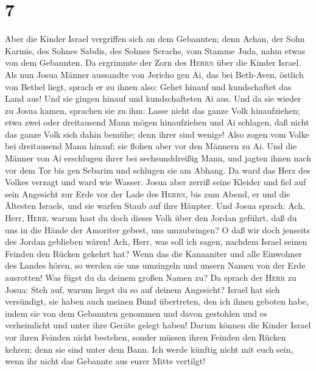 \hypertarget{section-6}{%
\section{7}\label{section-6}}

 Aber die Kinder Israel vergriffen sich an dem Gebannten;
denn Achan, der Sohn Karmis, des Sohnes Sabdis, des Sohnes Serachs, vom
Stamme Juda, nahm etwas von dem Gebannten. Da ergrimmte der Zorn des
\textsc{Herrn} über die Kinder Israel.  Als nun Josua
Männer aussandte von Jericho gen Ai, das bei Beth-Aven, östlich von
Bethel liegt, sprach er zu ihnen also: Gehet hinauf und kundschaftet das
Land aus! Und sie gingen hinauf und kundschafteten Ai aus.
 Und da sie wieder zu Josua kamen, sprachen sie zu ihm:
Lasse nicht das ganze Volk hinaufziehen; etwa zwei oder dreitausend Mann
mögen hinaufziehen und Ai schlagen, daß nicht das ganze Volk sich dahin
bemühe; denn ihrer sind wenige!  Also zogen vom Volke bei
dreitausend Mann hinauf; sie flohen aber vor den Männern zu Ai.
 Und die Männer von Ai erschlugen ihrer bei
sechsunddreißig Mann, und jagten ihnen nach vor dem Tor bis gen Sebarim
und schlugen sie am Abhang. Da ward das Herz des Volkes verzagt und ward
wie Wasser.  Josua aber zerriß seine Kleider und fiel auf
sein Angesicht zur Erde vor der Lade des \textsc{Herrn}, bis zum Abend,
er und die Ältesten Israels, und sie warfen Staub auf ihre Häupter.
 Und Josua sprach: Ach, Herr, \textsc{Herr}, warum hast du
doch dieses Volk über den Jordan geführt, daß du uns in die Hände der
Amoriter gebest, uns umzubringen? O daß wir doch jenseits des Jordan
geblieben wären!  Ach, Herr, was soll ich sagen, nachdem
Israel seinen Feinden den Rücken gekehrt hat?  Wenn das
die Kanaaniter und alle Einwohner des Landes hören, so werden sie uns
umzingeln und unsern Namen von der Erde ausrotten! Was fügst du da
deinem großen Namen zu?  Da sprach der \textsc{Herr} zu
Josua: Steh auf, warum liegst du so auf deinem Angesicht?
 Israel hat sich versündigt, sie haben auch meinen Bund
übertreten, den ich ihnen geboten habe, indem sie von dem Gebannten
genommen und davon gestohlen und es verheimlicht und unter ihre Geräte
gelegt haben!  Darum können die Kinder Israel vor ihren
Feinden nicht bestehen, sonder müssen ihren Feinden den Rücken kehren;
denn sie sind unter dem Bann. Ich werde künftig nicht mit euch sein,
wenn ihr nicht das Gebannte aus eurer Mitte vertilgt! 
